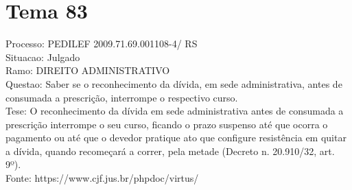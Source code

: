 \documentclass[12pt]{article}
\begin{document}
\section*{Tema 83}
Processo: PEDILEF 2009.71.69.001108-4/ RS\\
Situacao: Julgado\\
Ramo: DIREITO ADMINISTRATIVO\\
Questao: Saber se o reconhecimento da dívida, em sede administrativa, antes de consumada a prescrição, interrompe o respectivo curso.\\
Tese: O reconhecimento da dívida em sede administrativa antes de consumada a prescrição interrompe o seu curso, ficando o prazo suspenso até que ocorra o pagamento ou até que o devedor pratique ato que configure resistência em quitar a dívida, quando recomeçará a correr, pela metade (Decreto n. 20.910/32, art. 9º).\\
Fonte: https://www.cjf.jus.br/phpdoc/virtus/
\end{document}
